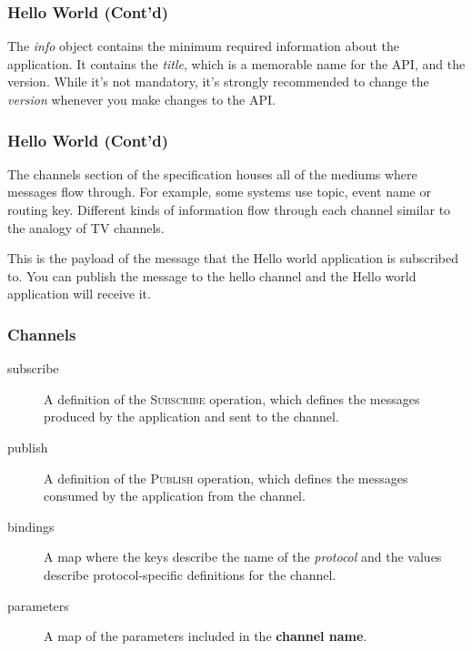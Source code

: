 \documentclass{efd-lecture}
\begin{document}
\begin{frame}[fragile]
  \frametitle{Hello World (Cont'd)}
  \begin{block}{}
    The \textit{\color{YellowOrange} info} object contains the minimum required information about the application.
    It contains the \textit{\color{YellowGreen} title}, which is a memorable name for the API, and the version. While it's not mandatory,
    it's strongly recommended to change the \textit{\color{YellowGreen} version} whenever you make changes to the API\@.
  \end{block}
\end{frame}

\begin{frame}[fragile]
  \frametitle{Hello World (Cont'd)}
  \begin{block}{}
    The channels section of the specification houses all of the mediums where messages flow through. For example,
    some systems use topic, event name or routing key.
    Different kinds of information flow through each channel similar to the analogy of TV channels.
  \end{block}
\end{frame}

\begin{frame}
  \begin{block}{}
    This is the payload of the message that the Hello world application is subscribed to.
    You can publish the message to the hello channel and the Hello world application will receive it.
  \end{block}
\end{frame}

\begin{frame}
  \frametitle{Channels}
  \begin{description}
    \item[subscribe] A definition of the \textsc{\color{YellowOrange}Subscribe} operation, which defines the messages produced by the application and sent to the channel.
    \item[publish] A definition of the \textsc{\color{LimeGreen}Publish} operation, which defines the messages consumed by the application from the channel.
    \item[bindings] A map where the keys describe the name of the \textit{protocol} and the values describe protocol-specific definitions for the channel.
    \item[parameters] A map of the parameters included in the \textbf{\color{Purple} channel name}.
  \end{description}
\end{frame}
\end{document}
